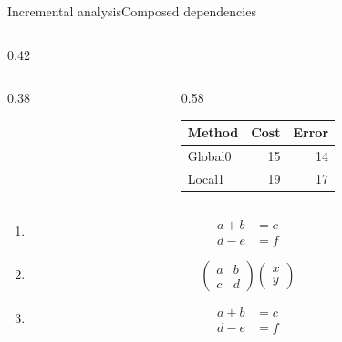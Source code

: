 \documentclass[10pt,aspectratio=169]{beamer}
\newcommand{\fuzzlayerA}[1]{\textbf{#1}}
\newcommand{\fuzzlayerB}[1]{\fuzzlayerA{#1}}
\newcommand{\fuzzlayerC}[1]{\fuzzlayerB{#1}}
\newcommand{\fuzzterm}[1]{\fuzzlayerC{#1}}
\newcommand{\fuzzunit}{ms}
\newcommand{\fuzzcoefficient}{2}
\begin{document}
\begin{frame}[t,shrink=5]{Incremental analysis}{Composed dependencies}
\begin{columns}[onlytextwidth,b]
\begin{column}{0.42\textwidth}
\begin{columns}[onlytextwidth,c]
\begin{column}{0.38\textwidth}
\end{column}
\begin{column}{0.58\textwidth}
\begin{tabular}{lrr}Method&Cost&Error\\\hline
Global0&15&14\\
Local1&19&17\\
\end{tabular}
\end{column}
\end{columns}
\par
\begin{enumerate}
\item<1-> \[\begin{aligned}a+b&=c\\ d-e&=f\end{aligned}\]
\item<2-> \[\begin{pmatrix}a&b\\c&d\end{pmatrix}\begin{pmatrix}x\\y\end{pmatrix}\]
\item<3-> \[\begin{aligned}a+b&=c\\ d-e&=f\end{aligned}\]
\end{enumerate}
\end{column}
\end{columns}
\par {}
\end{frame}
\renewcommand{\fuzzunit}{steps}
\renewcommand{\fuzzcoefficient}{2}
\renewcommand{\fuzzterm}[1]{{\textit{#1}}}
\end{document}
